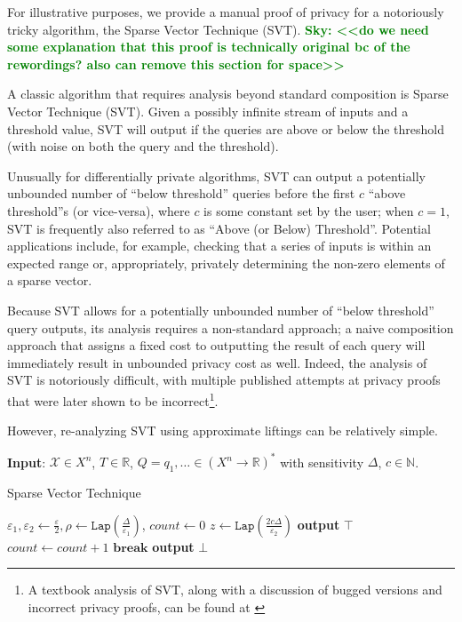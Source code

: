\documentclass[12pt]{article}
\newcommand{\NN}{\mathbb{N}}
\newcommand{\RR}{\mathbb{R}}
\newcommand{\Lap}{\texttt{Lap}}
\newcommand{\todo}[2]{\textcolor{#1}{\textbf{#2}}}
\newcommand{\sky}[1]{\todo{green}{Sky: <<#1>>}}
\theoremstyle{definition}
\begin{document}
For illustrative purposes, we provide a manual proof of privacy for a notoriously tricky algorithm, the Sparse Vector Technique (SVT). \sky{do we need some explanation that this proof is technically original bc of the rewordings? also can remove this section for space}

A classic algorithm that requires analysis beyond standard composition is Sparse Vector Technique (SVT). Given a possibly infinite stream of inputs and a threshold value, SVT will output if the queries are above or below the threshold (with noise on both the query and the threshold). 

Unusually for differentially private algorithms, SVT can output a potentially unbounded number of ``below threshold'' queries before the first $c$ ``above threshold''s (or vice-versa), where $c$ is some constant set by the user; when $c=1$, SVT is frequently also referred to as ``Above (or Below) Threshold''. Potential applications include, for example, checking that a series of inputs is within an expected range or, appropriately, privately determining the non-zero elements of a sparse vector. 

Because SVT allows for a potentially unbounded number of ``below threshold'' query outputs, its analysis requires a non-standard approach; a naive composition approach that assigns a fixed cost to outputting the result of each query will immediately result in unbounded privacy cost as well. 
Indeed, the analysis of SVT is notoriously difficult, with multiple published attempts at privacy proofs that were later shown to be incorrect\footnote{A textbook analysis of SVT, along with a discussion of bugged versions and incorrect privacy proofs, can be found at \cite{10.14778/3055330.3055331}}. 

However, re-analyzing SVT using approximate liftings can be relatively simple. 

\begin{algorithm}
    \hspace*{\algorithmicindent}\textbf{Input}: $\mathcal{X}\in X^n$, $T\in \RR$, $Q=q_1, \ldots \in {(X^n\to \RR)}^*$ with sensitivity $\Delta$, $c\in \NN$.
    \begin{algorithmic}[1]
        \caption{Sparse Vector Technique}\label{couplingAlg}
        \State $\varepsilon_1, \varepsilon_2 \gets \frac{\varepsilon}{2},
        \rho \gets \Lap(\frac{\Delta}{\varepsilon_1})$, $count \gets 0$
			\State $z\gets \Lap(\frac{2c\Delta}{\varepsilon_2})$
                \State\textbf{output} $\top$
                \State$count\gets count+1$
                    \State$\textbf{break}$
                \EndIf
            \Else
                \State\textbf{output} $\bot$
            \EndIf
		\EndFor
    \end{algorithmic}
\end{algorithm}
\end{document}
